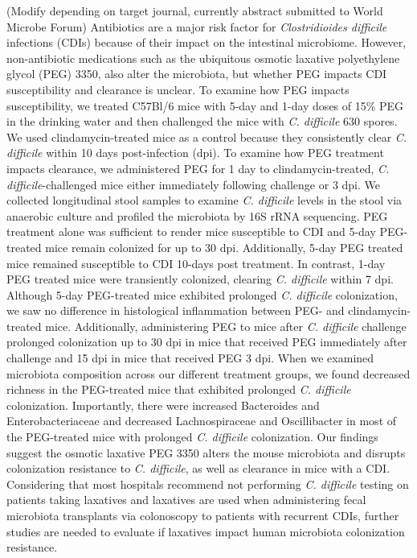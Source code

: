 \documentclass[
  11pt,
]{article}
\begin{document}
(Modify depending on target journal, currently abstract submitted to
World Microbe Forum) Antibiotics are a major risk factor for
\emph{Clostridioides difficile} infections (CDIs) because of their
impact on the intestinal microbiome. However, non-antibiotic medications
such as the ubiquitous osmotic laxative polyethylene glycol (PEG) 3350,
also alter the microbiota, but whether PEG impacts CDI susceptibility
and clearance is unclear. To examine how PEG impacts susceptibility, we
treated C57Bl/6 mice with 5-day and 1-day doses of 15\% PEG in the
drinking water and then challenged the mice with \emph{C. difficile} 630
spores. We used clindamycin-treated mice as a control because they
consistently clear \emph{C. difficile} within 10 days post-infection
(dpi). To examine how PEG treatment impacts clearance, we administered
PEG for 1 day to clindamycin-treated, \emph{C. difficile}-challenged
mice either immediately following challenge or 3 dpi. We collected
longitudinal stool samples to examine \emph{C. difficile} levels in the
stool via anaerobic culture and profiled the microbiota by 16S rRNA
sequencing. PEG treatment alone was sufficient to render mice
susceptible to CDI and 5-day PEG-treated mice remain colonized for up to
30 dpi. Additionally, 5-day PEG treated mice remained susceptible to CDI
10-days post treatment. In contrast, 1-day PEG treated mice were
transiently colonized, clearing \emph{C. difficile} within 7 dpi.
Although 5-day PEG-treated mice exhibited prolonged \emph{C. difficile}
colonization, we saw no difference in histological inflammation between
PEG- and clindamycin-treated mice. Additionally, administering PEG to
mice after \emph{C. difficile} challenge prolonged colonization up to 30
dpi in mice that received PEG immediately after challenge and 15 dpi in
mice that received PEG 3 dpi. When we examined microbiota composition
across our different treatment groups, we found decreased richness in
the PEG-treated mice that exhibited prolonged \emph{C. difficile}
colonization. Importantly, there were increased Bacteroides and
Enterobacteriaceae and decreased Lachnospiraceae and Oscillibacter in
most of the PEG-treated mice with prolonged \emph{C. difficile}
colonization. Our findings suggest the osmotic laxative PEG 3350 alters
the mouse microbiota and disrupts colonization resistance to \emph{C.
difficile}, as well as clearance in mice with a CDI. Considering that
most hospitals recommend not performing \emph{C. difficile} testing on
patients taking laxatives and laxatives are used when administering
fecal microbiota transplants via colonoscopy to patients with recurrent
CDIs, further studies are needed to evaluate if laxatives impact human
microbiota colonization resistance.
\end{document}
